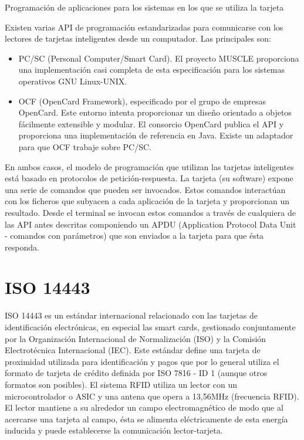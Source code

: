 \bigskip
Programación de aplicaciones para los sistemas en los que se utiliza la tarjeta

\bigskip
Existen varias API de programación estandarizadas para comunicarse con los lectores de tarjetas inteligentes desde un computador. Las principales son:

\begin{itemize}
\item PC/SC (Personal Computer/Smart Card). El proyecto MUSCLE proporciona una implementación casi completa de esta especificación para los sistemas operativos GNU Linux-UNIX. 
\item OCF (OpenCard Framework), especificado por el grupo de empresas OpenCard. Este entorno intenta proporcionar un diseño orientado a objetos fácilmente extensible y modular. El consorcio OpenCard publica el API y proporciona una implementación de referencia en Java. Existe un adaptador para que OCF trabaje sobre PC/SC. 
\end{itemize}


En ambos casos, el modelo de programación que utilizan las tarjetas inteligentes está basado en protocolos de petición-respuesta. La tarjeta (su software) expone una serie de comandos que pueden ser invocados. Estos comandos interactúan con los ficheros que subyacen a cada aplicación de la tarjeta y proporcionan un resultado. Desde el terminal se invocan estos comandos a través de cualquiera de las API antes descritas componiendo un APDU (Application Protocol Data Unit - comandos con parámetros) que son enviados a la tarjeta para que ésta responda.


\section{ISO 14443}

ISO 14443 es un estándar internacional relacionado con las tarjetas de identificación electrónicas, en especial las smart cards, gestionado conjuntamente por la Organización Internacional de Normalización (ISO) y la Comisión Electrotécnica Internacional (IEC).
Este estándar define una tarjeta de proximidad utilizada para identificación y pagos que por lo general utiliza el formato de tarjeta de crédito definida por ISO 7816 - ID 1 (aunque otros formatos son posibles).
El sistema RFID utiliza un lector con un microcontrolador o ASIC y una antena que opera a 13,56MHz (frecuencia RFID). El lector mantiene a su alrededor un campo electromagnético de modo que al acercarse una tarjeta al campo, ésta se alimenta eléctricamente de esta energía inducida y puede establecerse la comunicación lector-tarjeta.

